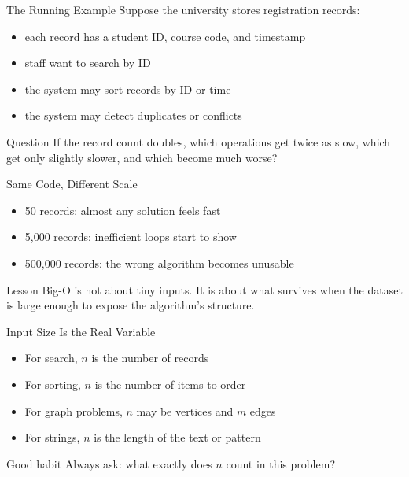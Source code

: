 \documentclass[aspectratio=169,xcolor=dvipsnames]{beamer}
\begin{document}
\begin{frame}{The Running Example}
  Suppose the university stores registration records:
  \begin{itemize}
    \item each record has a student ID, course code, and timestamp
    \item staff want to search by ID
    \item the system may sort records by ID or time
    \item the system may detect duplicates or conflicts
  \end{itemize}
  \begin{alertblock}{Question}
    If the record count doubles, which operations get twice as slow, which get only slightly slower, and which become much worse?
  \end{alertblock}
\end{frame}

\begin{frame}{Same Code, Different Scale}
  \begin{itemize}
    \item 50 records: almost any solution feels fast
    \item 5,000 records: inefficient loops start to show
    \item 500,000 records: the wrong algorithm becomes unusable
  \end{itemize}
  \begin{exampleblock}{Lesson}
    Big-O is not about tiny inputs. It is about what survives when the dataset is large enough to expose the algorithm's structure.
  \end{exampleblock}
\end{frame}

\begin{frame}{Input Size Is the Real Variable}
  \begin{itemize}
    \item For search, $n$ is the number of records
    \item For sorting, $n$ is the number of items to order
    \item For graph problems, $n$ may be vertices and $m$ edges
    \item For strings, $n$ is the length of the text or pattern
  \end{itemize}
  \begin{block}{Good habit}
    Always ask: what exactly does $n$ count in this problem?
  \end{block}
\end{frame}
\end{document}
